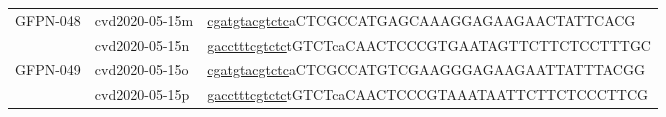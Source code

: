 \begin{landscape}
\begin{longtable}{|l|l|l|}
		\multirow{2}{*}{GFPN-048} & cvd2020-05-15m & \underline{cgatgta\underline{cgtctc}}aCTCGCCATGAGCAAAGGAGAAGAACTATTCACG    \\ \cline{2-3} 
		& cvd2020-05-15n & \underline{gaccttt\underline{cgtctc}}tGTCTcaCAACTCCCGTGAATAGTTCTTCTCCTTTGC \\ \hline
		\multirow{2}{*}{GFPN-049} & cvd2020-05-15o & \underline{cgatgta\underline{cgtctc}}aCTCGCCATGTCGAAGGGAGAAGAATTATTTACGG   \\ \cline{2-3} 
		& cvd2020-05-15p & \underline{gaccttt\underline{cgtctc}}tGTCTcaCAACTCCCGTAAATAATTCTTCTCCCTTCG \\ \hline
		
		
	\end{longtable}
	
\end{landscape}


